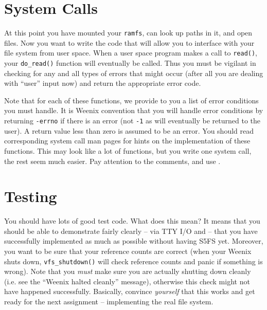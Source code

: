 \section{System Calls}

At this point you have mounted your \texttt{ramfs}, can look up paths in it, and open files. Now you want to write the code that will allow you to interface with your file system from user space. When a user space program makes a call to \texttt{read()}, your \texttt{do\_read()} function will eventually be called. Thus you must be vigilant in checking for any and all types of errors that might occur (after all you are dealing with ``user'' input now) and return the appropriate error code.

Note that for each of these functions, we provide to you a list of error conditions you must handle.  It is Weenix convention that you will handle error conditions by returning \texttt{-errno} if there is an error (not \texttt{-1} as will eventually be returned to the user). A return value less than zero is assumed to be an error. You should read corresponding system call man pages for hints on the implementation of these functions. This may look like a lot of functions, but you write one system call, the rest seem much easier. Pay attention to the comments, and use .

\section{Testing}

You should have lots of good test code. What does this mean? It means that you should be able to demonstrate fairly clearly -- via TTY I/O and  -- that you have successfully implemented as much as possible without having S5FS yet. Moreover, you want to be sure that your reference counts are correct (when your Weenix shuts down, \texttt{vfs\_shutdown()} will check reference counts and panic if something is wrong). Note that you \emph{must} make sure you are actually shutting down cleanly (i.e. see the ``Weenix halted cleanly'' message), otherwise this check might not have happened successfully. Basically, convince \emph{yourself} that this works and get ready for the next assignment -- implementing the real file system.

 
